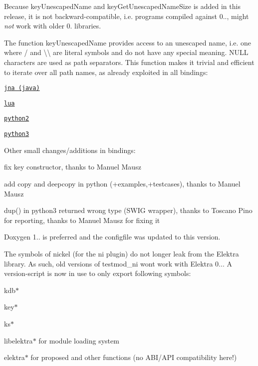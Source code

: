 Because {\ttfamily key\+Unescaped\+Name} and {\ttfamily key\+Get\+Unescaped\+Name\+Size} is added in this release, it is not backward-\/compatible, i.\+e. programs compiled against 0.., might {\itshape not} work with older 0. libraries.

The function {\ttfamily key\+Unescaped\+Name} provides access to an unescaped name, i.\+e. one where {\ttfamily /} and {\ttfamily \textbackslash{}\textbackslash{}} are literal symbols and do not have any special meaning. {\ttfamily N\+U\+LL} characters are used as path separators. This function makes it trivial and efficient to iterate over all path names, as already exploited in all bindings\+:


\begin{DoxyItemize}
\item \href{https://git.libelektra.org/blob/master/src/bindings/jna/HelloElektra.java}{\tt jna (java)}
\item \href{https://git.libelektra.org/blob/master/src/bindings/swig/lua/tests/test_key.lua}{\tt lua}
\item \href{https://git.libelektra.org/blob/master/src/bindings/swig/python2/tests/testpy2_key.py}{\tt python2}
\item \href{https://git.libelektra.org/blob/master/src/bindings/swig/python/tests/test_key.py}{\tt python3}
\end{DoxyItemize}

Other small changes/additions in bindings\+:


\begin{DoxyItemize}
\item fix key constructor, thanks to Manuel Mausz
\item add copy and deepcopy in python (+examples,+testcases), thanks to Manuel Mausz
\item dup() in python3 returned wrong type (S\+W\+IG wrapper), thanks to Toscano Pino for reporting, thanks to Manuel Mausz for fixing it
\end{DoxyItemize}

Doxygen 1.. is preferred and the configfile was updated to this version.

The symbols of nickel (for the ni plugin) do not longer leak from the Elektra library. As such, old versions of testmod\+\_\+ni won\textquotesingle{}t work with Elektra 0... A version-\/script is now in use to only export following symbols\+:


\begin{DoxyItemize}
\item {\ttfamily kdb$\ast$}
\item {\ttfamily key$\ast$}
\item {\ttfamily ks$\ast$}
\item {\ttfamily libelektra$\ast$} for module loading system
\item {\ttfamily elektra$\ast$} for proposed and other functions (no A\+B\+I/\+A\+PI compatibility here!)
\end{DoxyItemize}

